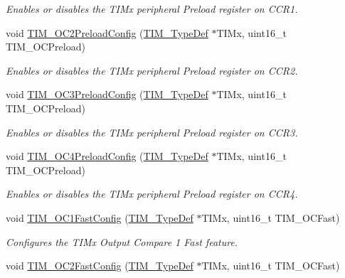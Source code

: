 \begin{DoxyCompactItemize}
\begin{DoxyCompactList}\small\item\em Enables or disables the T\+I\+Mx peripheral Preload register on C\+C\+R1. \end{DoxyCompactList}\item 
void \hyperlink{group___t_i_m___group2_ga75b4614c6dd2cd52f2c5becdb6590c10}{T\+I\+M\+\_\+\+O\+C2\+Preload\+Config} (\hyperlink{struct_t_i_m___type_def}{T\+I\+M\+\_\+\+Type\+Def} $\ast$T\+I\+Mx, uint16\+\_\+t T\+I\+M\+\_\+\+O\+C\+Preload)
\begin{DoxyCompactList}\small\item\em Enables or disables the T\+I\+Mx peripheral Preload register on C\+C\+R2. \end{DoxyCompactList}\item 
void \hyperlink{group___t_i_m___group2_ga8b2391685a519e60e596b7d596f86f09}{T\+I\+M\+\_\+\+O\+C3\+Preload\+Config} (\hyperlink{struct_t_i_m___type_def}{T\+I\+M\+\_\+\+Type\+Def} $\ast$T\+I\+Mx, uint16\+\_\+t T\+I\+M\+\_\+\+O\+C\+Preload)
\begin{DoxyCompactList}\small\item\em Enables or disables the T\+I\+Mx peripheral Preload register on C\+C\+R3. \end{DoxyCompactList}\item 
void \hyperlink{group___t_i_m___group2_ga8bf4dfb35ff0c7b494dd96579f50b1ec}{T\+I\+M\+\_\+\+O\+C4\+Preload\+Config} (\hyperlink{struct_t_i_m___type_def}{T\+I\+M\+\_\+\+Type\+Def} $\ast$T\+I\+Mx, uint16\+\_\+t T\+I\+M\+\_\+\+O\+C\+Preload)
\begin{DoxyCompactList}\small\item\em Enables or disables the T\+I\+Mx peripheral Preload register on C\+C\+R4. \end{DoxyCompactList}\item 
void \hyperlink{group___t_i_m___group2_gaec82031ca62f31f5483195c09752a83a}{T\+I\+M\+\_\+\+O\+C1\+Fast\+Config} (\hyperlink{struct_t_i_m___type_def}{T\+I\+M\+\_\+\+Type\+Def} $\ast$T\+I\+Mx, uint16\+\_\+t T\+I\+M\+\_\+\+O\+C\+Fast)
\begin{DoxyCompactList}\small\item\em Configures the T\+I\+Mx Output Compare 1 Fast feature. \end{DoxyCompactList}\item 
void \hyperlink{group___t_i_m___group2_ga413359c87f46c69f1ffe2dc8fb3a65e7}{T\+I\+M\+\_\+\+O\+C2\+Fast\+Config} (\hyperlink{struct_t_i_m___type_def}{T\+I\+M\+\_\+\+Type\+Def} $\ast$T\+I\+Mx, uint16\+\_\+t T\+I\+M\+\_\+\+O\+C\+Fast)

\end{DoxyCompactItemize}
